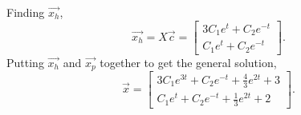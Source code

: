 Finding $\vec{x_h}$,
\begin{equation*}
	\vec{x_h} = X\vec{c} = \begin{bmatrix}
		3C_1e^t + C_2e^{-t} \\
		C_1e^t + C_2e^{-t}
	\end{bmatrix}.
\end{equation*}
Putting $\vec{x_h}$ and $\vec{x_p}$ together to get the general solution,
\begin{equation*}
	\vec{x} = \begin{bmatrix}
		3C_1e^{3t} + C_2e^{-t} + \frac{4}{3}e^{2t} + 3 \\
		C_1e^t + C_2e^{-t} + \frac{1}{3}e^{2t} + 2
	\end{bmatrix}.
\end{equation*}